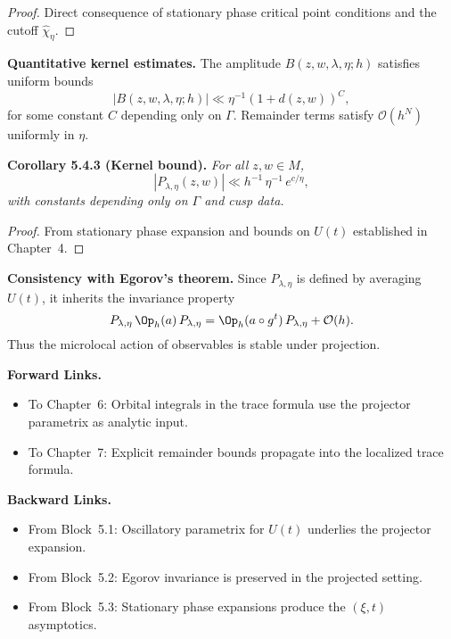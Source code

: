 \begin{proof}
Direct consequence of stationary phase critical point conditions
and the cutoff $\widehat{\chi}_\eta$.
\end{proof}

\medskip

\noindent\textbf{Quantitative kernel estimates.}
The amplitude $B(z,w,\lambda,\eta;h)$ satisfies uniform bounds
\[
   |B(z,w,\lambda,\eta;h)| \ll \eta^{-1}(1+d(z,w))^C,
\]
for some constant $C$ depending only on $\Gamma$.
Remainder terms satisfy $\mathcal{O}(h^N)$ uniformly in $\eta$.

\medskip

\noindent\textbf{Corollary 5.4.3 (Kernel bound).}
\emph{For all $z,w\in M$,}
\[
   |P_{\lambda,\eta}(z,w)| \ll h^{-1}\, \eta^{-1}\, e^{c/\eta},
\]
\emph{with constants depending only on $\Gamma$ and cusp data.}

\begin{proof}
From stationary phase expansion and bounds on $U(t)$ established in Chapter~4.
\end{proof}

\medskip

\noindent\textbf{Consistency with Egorov’s theorem.}
Since $P_{\lambda,\eta}$ is defined by averaging $U(t)$,
it inherits the invariance property
\[
   P_{\lambda,\eta}\, \Op_h(a)\, P_{\lambda,\eta}
   = \Op_h(a\circ g^t)\, P_{\lambda,\eta} + \mathcal{O}(h).
\]
Thus the microlocal action of observables is stable under projection.

\medskip

\noindent\textbf{Forward Links.}
\begin{itemize}
   \item To Chapter~6: Orbital integrals in the trace formula use the projector parametrix as analytic input.
   \item To Chapter~7: Explicit remainder bounds propagate into the localized trace formula.
\end{itemize}

\medskip

\noindent\textbf{Backward Links.}
\begin{itemize}
   \item From Block~5.1: Oscillatory parametrix for $U(t)$ underlies the projector expansion.
   \item From Block~5.2: Egorov invariance is preserved in the projected setting.
   \item From Block~5.3: Stationary phase expansions produce the $(\xi,t)$ asymptotics.
\end{itemize}

